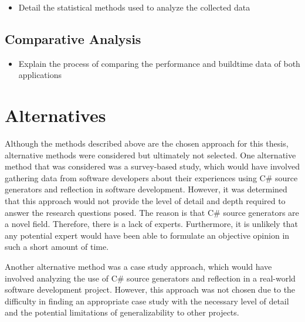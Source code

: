 \begin{itemize}
    \item Detail the statistical methods used to analyze the collected data
\end{itemize}

\subsection{Comparative Analysis}

\begin{itemize}
    \item Explain the process of comparing the performance and buildtime data of both applications
\end{itemize}

\section{Alternatives}

Although the methods described above are the chosen approach for this thesis, alternative methods were considered but ultimately not selected. One alternative method that was considered was a survey-based study, which would have involved gathering data from software developers about their experiences using C\# source generators and reflection in software development. However, it was determined that this approach would not provide the level of detail and depth required to answer the research questions posed. The reason is that C\# source generators are a novel field. Therefore, there is a lack of experts. Furthermore, it is unlikely that any potential expert would have been able to formulate an objective opinion in such a short amount of time.

Another alternative method was a case study approach, which would have involved analyzing the use of C\# source generators and reflection in a real-world software development project. However, this approach was not chosen due to the difficulty in finding an appropriate case study with the necessary level of detail and the potential limitations of generalizability to other projects.